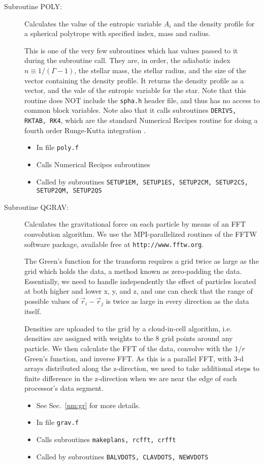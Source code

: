 \begin{description}
\item[Subroutine POLY:] Calculates the value of the entropic variable $A_i$ 
and the density profile for a spherical polytrope with specified index, 
mass and radius.

This is one of the very few subroutines which has values passed to it
during the subroutine call.  They are, in order, the adiabatic index
$n\equiv 1/(\Gamma-1)$, the stellar mass, the stellar radius, and the
size of the vector containing the density profile. It returns the
density profile as a vector, and the vale of the entropic variable for
the star.  Note that this routine does NOT include the {\tt spha.h}
header file, and thus has no access to common block variables.  
Note also that it calls subroutines {\tt DERIVS, RKTAB, RK4}, which are the
standard Numerical Recipes routine for doing a fourth order
Runge-Kutta integration \citep{NR}.
\begin{itemize} 
\item In file {\tt poly.f}
\item Calls Numerical Recipes subroutines
\item Called by subroutines {\tt SETUP1EM, SETUP1ES, SETUP2CM,
SETUP2CS, SETUP2QM, SETUP2QS} 
\end{itemize}

\item[Subroutine QGRAV:] Calculates the gravitational force on each
particle by means of an FFT convolution algorithm.  We use the
MPI-parallelized routines of the FFTW software package, available free
at {\tt http://www.fftw.org}.
 
The Green's function for the transform requires a grid twice as large
as the grid which holds the data, a method known as zero-padding the data.
Essentially, we need to handle independently the effect of particles located
at both higher and lower x, y, and z, and one can check that the range of
possible values of $\vec{r}_i-\vec{r}_j$ is twice as large in every direction as the
data itself.

Densities are uploaded to the grid by a cloud-in-cell algorithm, i.e. densities
are assigned with weights to the 8 grid points around any particle.  We then
calculate the FFT of the data, convolve with the $1/r$ Green's function, and
inverse FFT.  As this is a parallel FFT, with 3-d arrays distributed along the
z-direction, we need to take additional steps to finite difference in the
z-direction when we are near the edge of each processor's data segment.
\begin{itemize} 
\item See Sec.~\ref{nm:gr} for more details.
\item In file {\tt grav.f}
\item Calls subroutines {\tt makeplans, rcfft, crfft}
\item Called by subroutines {\tt BALVDOTS, CLAVDOTS, NEWVDOTS}
\end{itemize}


\end{description}
